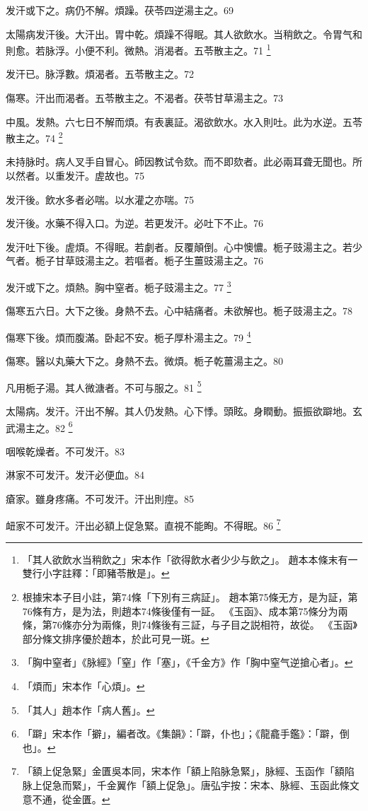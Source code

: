 发汗或下之。{\khaaitp 病仍}不解。煩躁。茯苓四逆湯主之。69

太陽病发汗後。大汗出。胃中乾。煩躁不得眠。其人欲飲水。当稍飲之。令胃气和則愈。若脉浮。小便不利。微熱。消渴者。五苓散主之。71
	\footnote{
		「其人欲飲水当稍飲之」宋本作「欲得飲水者少少与飲之」。
		趙本本條末有一雙行小字註釋：「即豬苓散是」。
	}

发汗已。脉浮數。煩渴者。五苓散主之。72

傷寒。汗出而渴者。五苓散主之。不渴者。茯苓甘草湯主之。73

中風。发熱。六七日不解而煩。有表裏証。渴欲飲水。水入則吐。此为水逆。五苓散主之。74
	\footnote{
		根據宋本子目小註，第74條「下別有三病証」。
		趙本第75條无方，是为証，第76條有方，是为法，則趙本74條後僅有一証。
		《玉函》、成本第75條分为兩條，第76條亦分为兩條，則74條後有三証，与子目之説相符，故從。
		《玉函》部分條文排序優於趙本，於此可見一斑。
	}

未持脉时。病人叉手自冒心。師因教试令欬。而不即欬者。此必兩耳聋无聞也。所以然者。以重发汗。虗故也。75

发汗後。飲水多者必喘。以水灌之亦喘。75

发汗後。水藥不得入口。为逆。{\khaaitp 若更发汗。必吐下不止。}76

发汗吐下後。虗煩。不得眠。若劇者。反覆顛倒。心中懊憹。栀子{\khaaitp 豉}湯主之。若少气者。栀子甘草{\khaaitp 豉}湯主之。若嘔者。栀子生薑{\khaaitp 豉}湯主之。76

发汗或下之。煩熱。胸中窒者。栀子{\khaaitp 豉}湯主之。77
	\footnote{
		「胸中窒者」《脉經》「窒」作「塞」，《千金方》作「胸中窒气逆搶心者」。
	}

傷寒五六日。大下之後。身熱不去。心中結痛者。未欲解也。栀子{\khaaitp 豉}湯主之。78

傷寒下後。煩而腹滿。卧起不安。栀子厚朴湯主之。79
	\footnote{
		「煩而」宋本作「心煩」。
	}

傷寒。醫以丸藥大下之。身熱不去。微煩。栀子乾薑湯主之。80

凡用栀子湯。其人微溏者。不可与服之。81
	\footnote{
		「其人」趙本作「病人舊」。
	}

太陽病。发汗。汗出不解。其人仍发熱。心下悸。頭眩。身瞤動。振振欲躃地。玄武湯主之。82
	\footnote{
		「躃」宋本作「擗」，編者改。《集韻》：「躃，仆也」；《龍龕手鑑》：「躃，倒也」。
	}

咽喉乾燥者。不可发汗。83

淋家不可发汗。发汗必便血。84

瘡家。雖身疼痛。不可发汗。汗出則痙。85

衄家不可发汗。汗出必額上促急{\khaaitp 緊}。直視不能眴。不得眠。86
	\footnote{
		「額上促急緊」金匱吳本同，宋本作「額上陷脉急緊」，脉經、玉函作「額陷脉上促急而緊」，千金翼作「額上促急」。唐弘宇按：宋本、脉經、玉函此條文意不通，從金匱。
	}

